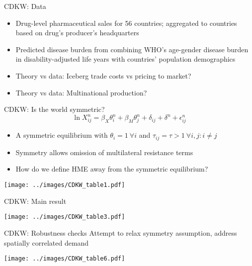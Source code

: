 \documentclass[10pt,notes=hide]{beamer}
\begin{document}
\begin{frame}{CDKW: Data}
\begin{itemize}
	\item Drug-level pharmaceutical sales for 56 countries; aggregated to countries based on drug's producer's headquarters
	\item Predicted disease burden from combining WHO's age-gender disease burden in disability-adjusted life years with countries' population demographics
	\item Theory vs data: Iceberg trade costs vs pricing to market?
	\item Theory vs data: Multinational production?
\end{itemize}
\end{frame}
\begin{frame}{CDKW: Is the world symmetric?}
\begin{equation*}
	\ln X_{ij}^n = \beta_X \theta_i^n + \beta_M \theta_j^n +  \delta_{ij} + \delta^n + \epsilon_{ij}^n
\end{equation*}
\begin{itemize}
	\item A symmetric equilibrium with $\theta_i = 1 \ \forall i$ and $\tau_{ij} = \tau > 1 \ \forall i,j:i \neq j$
	\item Symmetry allows omission of multilateral resistance terms
	\item How do we define HME away from the symmetric equilibrium?
\end{itemize}
\begin{center}\texttt{[image: ../images/CDKW\_table1.pdf]}\end{center}
\end{frame}
\begin{frame}{CDKW: Main result}
\begin{center}\texttt{[image: ../images/CDKW\_table3.pdf]}\end{center}
\end{frame}
\begin{frame}{CDKW: Robustness checks}
Attempt to relax symmetry assumption, address spatially correlated demand
\begin{center}\texttt{[image: ../images/CDKW\_table6.pdf]}\end{center}
\end{frame}
\end{document}
